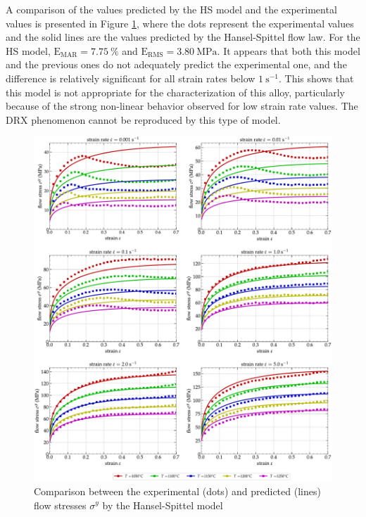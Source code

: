\documentclass[metals,article,submit,pdftex,moreauthors]{Definitions/mdpi}
\DeclareRobustCommand{\RMSE}{\text{E}_\text{RMS}}
\DeclareRobustCommand{\MARE}{\text{E}_\text{MAR}}
\DeclareRobustCommand{\ps}{\text{s}^{-1}}
\DeclareRobustCommand{\MPa}{\text{MPa}}
\begin{document}
A comparison of the values predicted by the HS model and the experimental values is presented in Figure \ref{fig:CompExp-HS-6}, where the dots represent the experimental values and the solid lines are the values predicted by the Hansel-Spittel flow law.
For the HS model, $\MARE=7.75~\%$ and $\RMSE=3.80~\MPa$.
It appears that both this model and the previous ones do not adequately predict the experimental one, and the difference is relatively significant for all strain rates below $1~\ps$.
This shows that this model is not appropriate for the characterization of this alloy, particularly because of the strong non-linear behavior observed for low strain rate values.
The DRX phenomenon cannot be reproduced by this type of model.

\begin{figure}[!ht]
\centering
\includegraphics[width=\columnwidth]
{Figures/CompExp-HS-6}
\caption{Comparison between the experimental (dots) and predicted (lines) flow stresses $\sigma^y$ by the Hansel-Spittel model}
\label{fig:CompExp-HS-6}
\end{figure}

\end{document}
